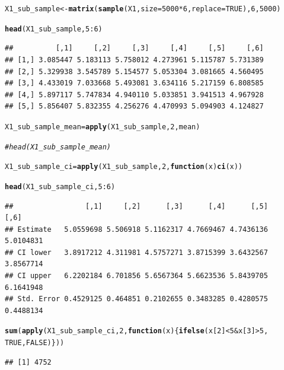 \documentclass{article}\usepackage[]{graphicx}\usepackage[]{color}
\makeatletter
\newcommand{\hlnum}[1]{\textcolor[rgb]{0.686,0.059,0.569}{#1}}%
\newcommand{\hlcom}[1]{\textcolor[rgb]{0.678,0.584,0.686}{\textit{#1}}}%
\newcommand{\hlopt}[1]{\textcolor[rgb]{0,0,0}{#1}}%
\newcommand{\hlstd}[1]{\textcolor[rgb]{0.345,0.345,0.345}{#1}}%
\newcommand{\hlkwa}[1]{\textcolor[rgb]{0.161,0.373,0.58}{\textbf{#1}}}%
\newcommand{\hlkwb}[1]{\textcolor[rgb]{0.69,0.353,0.396}{#1}}%
\newcommand{\hlkwc}[1]{\textcolor[rgb]{0.333,0.667,0.333}{#1}}%
\newcommand{\hlkwd}[1]{\textcolor[rgb]{0.737,0.353,0.396}{\textbf{#1}}}%
\newenvironment{kframe}{%
 \def\at@end@of@kframe{}%
 \ifinner\ifhmode%
  \def\at@end@of@kframe{\end{minipage}}%
  \begin{minipage}{\columnwidth}%
 \fi\fi%
 \def\FrameCommand##1{\hskip\@totalleftmargin \hskip-\fboxsep
 \colorbox{shadecolor}{##1}\hskip-\fboxsep
     \hskip-\linewidth \hskip-\@totalleftmargin \hskip\columnwidth}%
 \MakeFramed {\advance\hsize-\width
   \@totalleftmargin\z@ \linewidth\hsize
   \@setminipage}}%
 {\par\unskip\endMakeFramed%
 \at@end@of@kframe}
\newenvironment{knitrout}{}{} %
\makeatother
\begin{document}
\begin{knitrout}
\color{fgcolor}\begin{kframe}
\begin{alltt}
\hlstd{X1_sub_sample} \hlkwb{<-} \hlkwd{matrix}\hlstd{(}\hlkwd{sample}\hlstd{(X1,} \hlkwc{size} \hlstd{=} \hlnum{5000} \hlopt{*}\hlnum{6}\hlstd{,} \hlkwc{replace} \hlstd{=} \hlnum{TRUE}\hlstd{),}\hlnum{6}\hlstd{,} \hlnum{5000}\hlstd{)}

\hlkwd{head}\hlstd{(X1_sub_sample,}\hlnum{5}\hlopt{:}\hlnum{6}\hlstd{)}
\end{alltt}
\begin{verbatim}
##          [,1]     [,2]     [,3]     [,4]     [,5]     [,6]
## [1,] 3.085447 5.183113 5.758012 4.273961 5.115787 5.731389
## [2,] 5.329938 3.545789 5.154577 5.053304 3.081665 4.560495
## [3,] 4.433019 7.033668 5.493081 3.634116 5.217159 6.808585
## [4,] 5.897117 5.747834 4.940110 5.033851 3.941513 4.967928
## [5,] 5.856407 5.832355 4.256276 4.470993 5.094903 4.124827
\end{verbatim}
\begin{alltt}
\hlstd{X1_sub_sample_mean} \hlkwb{=} \hlkwd{apply}\hlstd{(X1_sub_sample,} \hlnum{2}\hlstd{, mean)}

\hlcom{#head(X1_sub_sample_mean)}

\hlstd{X1_sub_sample_ci} \hlkwb{=} \hlkwd{apply}\hlstd{(X1_sub_sample,} \hlnum{2}\hlstd{,} \hlkwa{function}\hlstd{(}\hlkwc{x}\hlstd{)} \hlkwd{ci}\hlstd{(x))}

\hlkwd{head}\hlstd{(X1_sub_sample_ci,}\hlnum{5}\hlopt{:}\hlnum{6}\hlstd{)}
\end{alltt}
\begin{verbatim}
##                 [,1]     [,2]      [,3]      [,4]      [,5]      [,6]
## Estimate   5.0559698 5.506918 5.1162317 4.7669467 4.7436136 5.0104831
## CI lower   3.8917212 4.311981 4.5757271 3.8715399 3.6432567 3.8567714
## CI upper   6.2202184 6.701856 5.6567364 5.6623536 5.8439705 6.1641948
## Std. Error 0.4529125 0.464851 0.2102655 0.3483285 0.4280575 0.4488134
\end{verbatim}
\begin{alltt}
\hlkwd{sum}\hlstd{(}\hlkwd{apply}\hlstd{(X1_sub_sample_ci,} \hlnum{2}\hlstd{,} \hlkwa{function}\hlstd{(}\hlkwc{x}\hlstd{)\{}\hlkwd{ifelse}\hlstd{(x[}\hlnum{2}\hlstd{]} \hlopt{<} \hlnum{5} \hlopt{&} \hlstd{x[}\hlnum{3}\hlstd{]} \hlopt{>} \hlnum{5}\hlstd{,}
                                                  \hlnum{TRUE}\hlstd{,} \hlnum{FALSE}\hlstd{)\}))}
\end{alltt}
\begin{verbatim}
## [1] 4752
\end{verbatim}
\end{kframe}
\end{knitrout}
\end{document}
